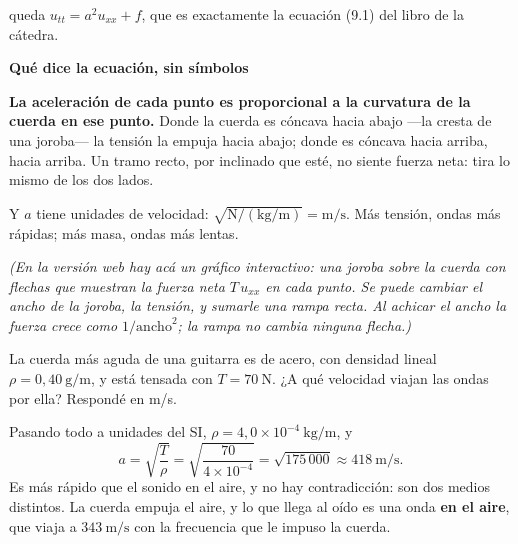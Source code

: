 \documentclass[
  spanish,
  a4paper,
]{scrbook}
\theoremstyle{definition}
\theoremstyle{plain}
\theoremstyle{definition}
\theoremstyle{plain}
\theoremstyle{definition}
\theoremstyle{remark}
\begin{document}
queda \(u_{tt} = a^2u_{xx} + f\), que es exactamente la ecuación (9.1)
del libro de la cátedra.

\begin{tcolorbox}[enhanced jigsaw, arc=.35mm, bottomrule=.15mm, breakable, colback=white, colframe=quarto-callout-important-color-frame, left=2mm, leftrule=.75mm, opacityback=0, rightrule=.15mm, toprule=.15mm]
\begin{minipage}[t]{5.5mm}
\textcolor{quarto-callout-important-color}{\faExclamation}
\end{minipage}%
\begin{minipage}[t]{\textwidth - 5.5mm}

\vspace{-3mm}\textbf{Qué dice la ecuación, sin símbolos}\vspace{3mm}

\textbf{La aceleración de cada punto es proporcional a la curvatura de
la cuerda en ese punto.} Donde la cuerda es cóncava hacia abajo ---la
cresta de una joroba--- la tensión la empuja hacia abajo; donde es
cóncava hacia arriba, hacia arriba. Un tramo recto, por inclinado que
esté, no siente fuerza neta: tira lo mismo de los dos lados.

Y \(a\) tiene unidades de velocidad:
\(\sqrt{\text{N}/(\text{kg/m})} = \text{m/s}\). Más tensión, ondas más
rápidas; más masa, ondas más lentas.

\end{minipage}%
\end{tcolorbox}

\emph{(En la versión web hay acá un gráfico interactivo: una joroba
sobre la cuerda con flechas que muestran la fuerza neta \(T\,u_{xx}\) en
cada punto. Se puede cambiar el ancho de la joroba, la tensión, y
sumarle una rampa recta. Al achicar el ancho la fuerza crece como
\(1/\text{ancho}^2\); la rampa no cambia ninguna flecha.)}

La cuerda más aguda de una guitarra es de acero, con densidad lineal
\(\rho = 0{,}40\ \text{g/m}\), y está tensada con \(T = 70\ \text{N}\).
¿A qué velocidad viajan las ondas por ella? Respondé en m/s.

Pasando todo a unidades del SI,
\(\rho = 4{,}0\times 10^{-4}\ \text{kg/m}\), y
\[a = \sqrt{\frac{T}{\rho}} = \sqrt{\frac{70}{4\times10^{-4}}} = \sqrt{175\,000} \approx 418\ \text{m/s}.\]
Es más rápido que el sonido en el aire, y no hay contradicción: son dos
medios distintos. La cuerda empuja el aire, y lo que llega al oído es
una onda \textbf{en el aire}, que viaja a \(343\ \text{m/s}\) con la
frecuencia que le impuso la cuerda.
\end{document}
